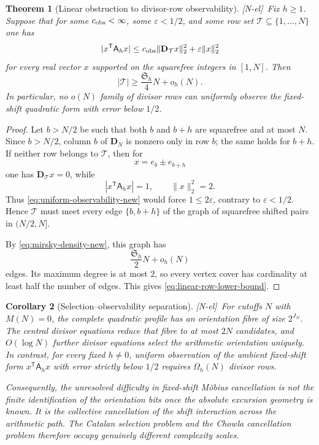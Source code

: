 \documentclass[11pt]{amsart}
\numberwithin{equation}{section}
\theoremstyle{plain}
\newtheorem{theorem}{Theorem}[section]
\newtheorem{corollary}[theorem]{Corollary}
\theoremstyle{definition}
\theoremstyle{remark}
\newcommand{\tagNE}{\textup{[N-el]}}
\begin{document}
\begin{theorem}[Linear obstruction to divisor-row observability]
\label{thm:linear-observability-obstruction}
\tagNE\ Fix $h\ge1$.  Suppose that for some $c_{\rm obs}<\infty$, some $\varepsilon<1/2$, and some row set $\mathcal T\subseteq\{1,\dots,N\}$ one has
\begin{equation}
|x^{\mathsf T}\mathsf A_hx|
\le
c_{\rm obs}\|\mathbf D_\mathcal T x\|_2^2
+
\varepsilon\|x\|_2^2
\label{eq:uniform-observability-new}
\end{equation}
for every real vector $x$ supported on the squarefree integers in $[1,N]$.  Then
\begin{equation}
|\mathcal T|
\ge
\frac{\mathfrak S_h}{4}N+o_h(N).
\label{eq:linear-row-lower-bound}
\end{equation}
In particular, no $o(N)$ family of divisor rows can uniformly observe the fixed-shift quadratic form with error below $1/2$.
\end{theorem}

\begin{proof}
Let $b>N/2$ be such that both $b$ and $b+h$ are squarefree and at most $N$.  Since $b>N/2$, column $b$ of $\mathbf D_N$ is nonzero only in row $b$; the same holds for $b+h$.  If neither row belongs to $\mathcal T$, then for
\[
x=e_b\pm e_{b+h}
\]
one has $\mathbf D_\mathcal T x=0$, while
\[
|x^{\mathsf T}\mathsf A_hx|=1,
\qquad
\|x\|_2^2=2.
\]
Thus \eqref{eq:uniform-observability-new} would force $1\le2\varepsilon$, contrary to $\varepsilon<1/2$.  Hence $\mathcal T$ must meet every edge $\{b,b+h\}$ of the graph of squarefree shifted pairs in $(N/2,N]$.

By \eqref{eq:mirsky-density-new}, this graph has
\[
\frac{\mathfrak S_h}{2}N+o_h(N)
\]
edges.  Its maximum degree is at most $2$, so every vertex cover has cardinality at least half the number of edges.  This gives \eqref{eq:linear-row-lower-bound}.
\end{proof}

\begin{corollary}[Selection--observability separation]
\label{cor:selection-observability-separation}
\tagNE\ For cutoffs $N$ with $M(N)=0$, the complete quadratic profile has an orientation fibre of size $2^{J_N}$.  The central divisor equations reduce that fibre to at most $2N$ candidates, and $O(\log N)$ further divisor equations select the arithmetic orientation uniquely.  In contrast, for every fixed $h\ne0$, uniform observation of the ambient fixed-shift form $x^{\mathsf T}\mathsf A_hx$ with error strictly below $1/2$ requires $\Omega_h(N)$ divisor rows.

Consequently, the unresolved difficulty in fixed-shift M\"obius cancellation is not the finite identification of the orientation bits once the absolute excursion geometry is known.  It is the collective cancellation of the shift interaction across the arithmetic path.  The Catalan selection problem and the Chowla cancellation problem therefore occupy genuinely different complexity scales.
\end{corollary}
\end{document}
